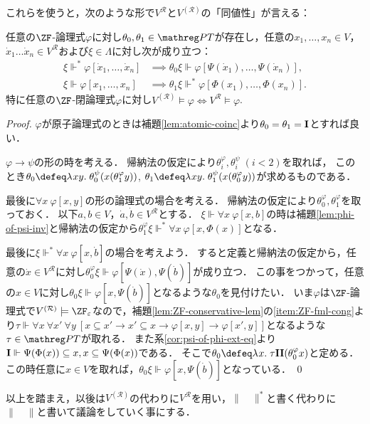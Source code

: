\documentclass[realisability.tex]{subfiles}
\begin{document}
これらを使うと，次のような形で$V^{\mathcal{R}}$と$V^{(\mathcal{R})}$の「同値性」が言える：
\begin{theorem}
 任意の$\ZF$-論理式$\varphi$に対し$\theta_0, \theta_1 \in \PT$が存在し，任意の$x_1, \dots, x_n \in V$，$\dot{x}_1 \dots \dot{x}_n \in V^{\mathcal{R}}$および$\xi \in \Lambda$に対し次が成り立つ：
 \begin{align*}
  \xi \Vdash^* \varphi[\dot{x}_1, \dots, \dot{x}_n] &\implies \theta_0 \xi \Vdash \varphi[\Psi(\dot{x}_1), \dots, \Psi(\dot{x}_n)],\\
  \xi \Vdash \varphi[x_1, \dots, x_n] &\implies \theta_1 \xi \Vdash^* \varphi[\Phi(x_1), \dots, \Phi(x_n)].
 \end{align*}
 特に任意の$\ZF$-閉論理式$\varphi$に対し$V^{(\mathcal{R})} \models \varphi \iff V^{\mathcal{R}} \models \varphi$.
\end{theorem}
\begin{proof}
 $\varphi$が原子論理式のときは補題\ref{lem:atomic-coinc}より$\theta_0 = \theta_1 = \mathsf{\mathbf{I}}$とすれば良い．

 $\varphi \to \psi$の形の時を考える．
 帰納法の仮定により$\theta^\varphi_i, \theta^\psi_i\;(i < 2)$を取れば，
 このとき$\theta_0 \defeq \abs{xy}{\theta^\psi_0(x(\theta^\varphi_1 y))}$, $\theta_1 \defeq \abs{xy}{\theta^\psi_1(x(\theta^\varphi_0 y))}$が求めるものである．

 最後に$\forall x \: \varphi[x, y]$の形の論理式の場合を考える．
 帰納法の仮定により$\theta^\varphi_0, \theta^\varphi_1$を取っておく．
 以下$a,b \in V$，$\dot{a}, \dot{b} \in V^{\mathcal{R}}$とする．
 $\xi \Vdash \forall x \: \varphi[x, b]$の時は補題\ref{lem:phi-of-psi-inv}と帰納法の仮定から$\theta^\varphi_1 \xi \Vdash^* \forall x \: \varphi[x, \Phi(x)]$となる．

 最後に$\xi \Vdash^* \forall x \: \varphi[x, \dot{b}]$の場合を考えよう．
 すると定義と帰納法の仮定から，任意の$\dot{x} \in V^{\mathcal{R}}$に対し$\theta^\varphi_0 \xi \Vdash \varphi[\Psi(\dot{x}), \Psi(\dot{b})]$が成り立つ．
 この事をつかって，任意の$x \in V$に対し$\theta_0 \xi \Vdash \varphi[x, \Psi(\dot{b})]$となるような$\theta_0$を見付けたい．
 いま$\varphi$は$\ZF$-論理式で$V^{(\mathcal{R})} \models \ZFe$なので，補題\ref{lem:ZF-conservative-lem}の\ref{item:ZF-fml-cong}より$\tau \Vdash \forall x \: \forall x'\: \forall y \: [x \subseteq x' \to x' \subseteq x \to \varphi[x, y] \to \varphi[x', y]]$となるような$\tau \in \PT$が取れる．
 また系\ref{cor:psi-of-phi-ext-eq}より$\mathsf{\mathbf{I}} \Vdash \Psi(\Phi(x)) \subseteq x, x \subseteq \Psi(\Phi(x))$である．
 そこで$\theta_0 \defeq \abs{x}{\tau\I\I(\theta^\varphi_0 x)}$と定める．
 この時任意に$x \in V$を取れば，$\theta_0 \xi \Vdash \varphi[x, \Psi(\dot{b})]$となっている． \qed
\end{proof}

以上を踏まえ，以後は$V^{(\mathcal{R})}$の代わりに$V^{\mathcal{R}}$を用い，$\|\quad\|^*$と書く代わりに$\|\quad\|$と書いて議論をしていく事にする．
\end{document}
